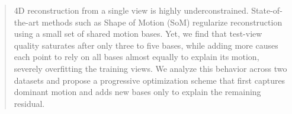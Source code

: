 \begin{abstract}
  4D reconstruction from a single view is highly underconstrained. State-of-the-art methods such as Shape of Motion (SoM) regularize reconstruction using a small set of shared motion bases. Yet, we find that test-view quality saturates after only three to five bases, while adding more causes each point to rely on all bases almost equally to explain its motion, severely overfitting the training views. We analyze this behavior across two datasets and propose a progressive optimization scheme that first captures dominant motion and adds new bases only to explain the remaining residual. 

\end{abstract}
